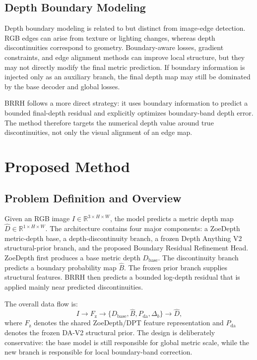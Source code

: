 \documentclass{ieeeaccess}
\begin{document}
\subsection{Depth Boundary Modeling}

Depth boundary modeling is related to but distinct from image-edge detection. RGB edges can arise from texture or lighting changes, whereas depth discontinuities correspond to geometry. Boundary-aware losses, gradient constraints, and edge alignment methods can improve local structure, but they may not directly modify the final metric prediction. If boundary information is injected only as an auxiliary branch, the final depth map may still be dominated by the base decoder and global losses.

BRRH follows a more direct strategy: it uses boundary information to predict a bounded final-depth residual and explicitly optimizes boundary-band depth error. The method therefore targets the numerical depth value around true discontinuities, not only the visual alignment of an edge map.

\section{Proposed Method}

\subsection{Problem Definition and Overview}

Given an RGB image $I \in \mathbb{R}^{3 \times H \times W}$, the model predicts a metric depth map $\hat{D} \in \mathbb{R}^{1 \times H \times W}$. The architecture contains four major components: a ZoeDepth metric-depth base, a depth-discontinuity branch, a frozen Depth Anything V2 structural-prior branch, and the proposed Boundary Residual Refinement Head. ZoeDepth first produces a base metric depth $D_{\mathrm{base}}$. The discontinuity branch predicts a boundary probability map $\hat{B}$. The frozen prior branch supplies structural features. BRRH then predicts a bounded log-depth residual that is applied mainly near predicted discontinuities.

The overall data flow is:
\begin{equation}
I \rightarrow F_{\mathrm{z}} \rightarrow
\{D_{\mathrm{base}},\hat{B},P_{\mathrm{da}},\Delta_b\}
\rightarrow \hat{D},
\end{equation}
where $F_{\mathrm{z}}$ denotes the shared ZoeDepth/DPT feature representation and $P_{\mathrm{da}}$ denotes the frozen DA-V2 structural prior. The design is deliberately conservative: the base model is still responsible for global metric scale, while the new branch is responsible for local boundary-band correction.
\end{document}
